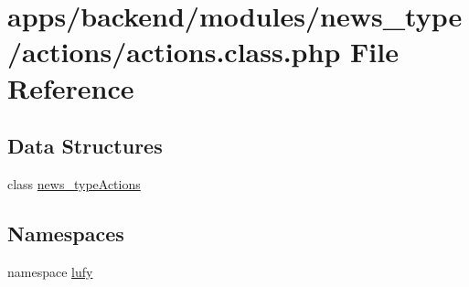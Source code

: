 \hypertarget{backend_2modules_2news__type_2actions_2actions_8class_8php}{\section{apps/backend/modules/news\-\_\-type/actions/actions.class.\-php File Reference}
\label{backend_2modules_2news__type_2actions_2actions_8class_8php}
}
\subsection*{Data Structures}
\begin{DoxyCompactItemize}
\item 
class \hyperlink{classnews__type_actions}{news\-\_\-type\-Actions}
\end{DoxyCompactItemize}
\subsection*{Namespaces}
\begin{DoxyCompactItemize}
\item 
namespace \hyperlink{namespacelufy}{lufy}
\end{DoxyCompactItemize}
